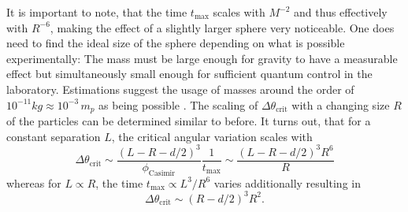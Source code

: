 It is important to note, that the time $t_\mathrm{max}$ scales with $M^{-2}$ and thus effectively with $R^{-6}$, making the effect of a slightly larger sphere very noticeable.
One does need to find the ideal size of the sphere depending on what is possible experimentally: The mass must be large enough for gravity to have a measurable effect but simultaneously small enough for sufficient quantum control in the laboratory. 
Estimations suggest the usage of masses around the order of $10^{-11}\si{kg} \approx 10^{-3}\,m_p$ as being possible \cite{Aspelmeyer_2024}.
The scaling of $\Delta \theta_\mathrm{crit}$ with a changing size $R$ of the particles can be determined similar to before. It turns out, that for a constant separation $L$, the critical angular variation scales with 
\begin{equation}
  \Delta \theta_\mathrm{crit} \sim \frac{(L - R - d/2)^3}{\phi_\mathrm{Casimir}} \frac{1}{t_\mathrm{max}} \sim \frac{(L - R - d/2)^3 R^6}{R}
\end{equation}
whereas for $L \propto R$, the time $t_\mathrm{max} \propto L^3/R^6$ varies additionally resulting in
\begin{equation}
  \Delta \theta_\mathrm{crit} \sim (R - d/2)^3 R^2 .
\end{equation}

